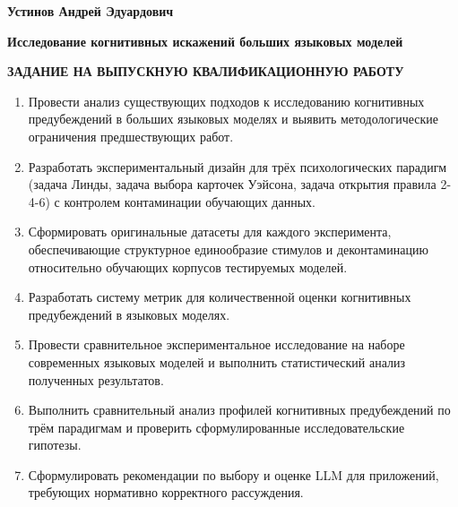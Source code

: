 
\begin{titlepage}

\begin{center}
{\LARGE\bfseries Устинов Андрей Эдуардович}
\end{center}

\vspace{1cm}

\begin{center}
{\LARGE\bfseries Исследование когнитивных искажений больших языковых моделей}
\end{center}

\vspace{1.5cm}

\noindent\textbf{ЗАДАНИЕ НА ВЫПУСКНУЮ КВАЛИФИКАЦИОННУЮ РАБОТУ}

\vspace{0.5cm}

\begin{enumerate}
  \item Провести анализ существующих подходов к исследованию когнитивных предубеждений в больших языковых моделях и выявить методологические ограничения предшествующих работ.
  \item Разработать экспериментальный дизайн для трёх психологических парадигм (задача Линды, задача выбора карточек Уэйсона, задача открытия правила 2-4-6) с контролем контаминации обучающих данных.
  \item Сформировать оригинальные датасеты для каждого эксперимента, обеспечивающие структурное единообразие стимулов и деконтаминацию относительно обучающих корпусов тестируемых моделей.
  \item Разработать систему метрик для количественной оценки когнитивных предубеждений в языковых моделях.
  \item Провести сравнительное экспериментальное исследование на наборе современных языковых моделей и выполнить статистический анализ полученных результатов.
  \item Выполнить сравнительный анализ профилей когнитивных предубеждений по трём парадигмам и проверить сформулированные исследовательские гипотезы.
  \item Сформулировать рекомендации по выбору и оценке LLM для приложений, требующих нормативно корректного рассуждения.
\end{enumerate}

\vspace{1cm}


\end{titlepage}
